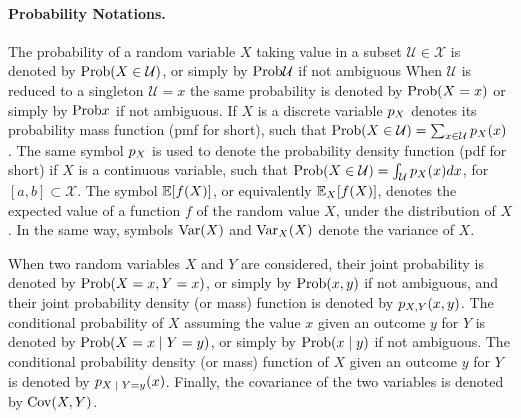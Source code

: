 \paragraph*{Probability Notations.}
The probability of a random variable $X$ taking value in a subset $\mathcal{U}\in\mathcal{X}$ is denoted by $\mathrm{Prob}(X\in\mathcal{U})$, or simply by $\mathrm{Prob}{\mathcal{U}}$ if not ambiguous When $\mathcal{U}$ is reduced to a singleton $\mathcal{U}=x$ the same probability is denoted by $\mathrm{Prob}(X=x)$ or simply by $\mathrm{Prob}{x}$ if not ambiguous. If $X$ is a discrete variable $p_X$ denotes its probability mass function (pmf for short), such that $\mathrm{Prob}(X\in\mathcal{U})=\sum_{x\in \mathcal{U}}p_X(x)$. The same symbol $p_X$ is used to denote the probability density function (pdf for short) if $X$ is a continuous variable, such that $\mathrm{Prob}(X\in \mathcal{U}) = \int_{\mathcal{U}}p_X(x)dx$, for $[a,b]\subset\mathcal{X}$. 
The symbol $\mathbb{E}[f(X)]$, or equivalently $\mathbb{E}_X[f(X)]$, denotes the expected value of a function $f$ of the random value $X$, under the distribution of $X$. In the same way, symbols $\mathrm{Var}(X)$ and $\mathrm{Var}_X(X)$ denote the variance of $X$.

When two random variables $X$ and $Y$ are considered, their joint probability is denoted by $\mathrm{Prob}(X=x,Y=x)$, or simply by $\mathrm{Prob}(x,y)$ if not ambiguous, and their joint probability density (or mass) function is denoted by $p_{X,Y}(x,y)$. The conditional probability of $X$ assuming the value $x$ given an outcome $y$ for $Y$ is denoted by $\prob (\given{X=x}{Y=y})$, or simply by $\prob(\given{x}{y})$ if not ambiguous. The conditional probability density (or mass) function of $X$ given an outcome $y$ for $Y$ is denoted by $\pdf_{\given{X} {Y=y}}(x)$. Finally, the covariance of the two variables is denoted by $\mathrm{Cov}(X,Y)$.\\



